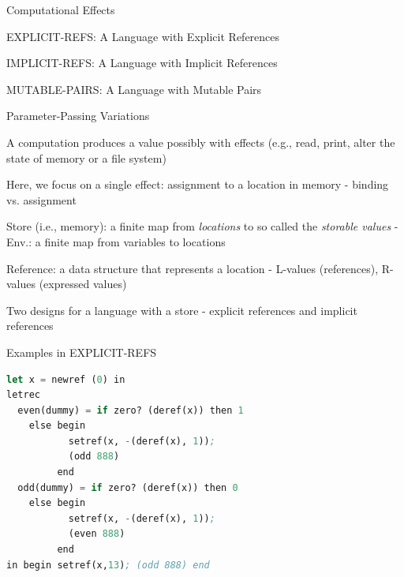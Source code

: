 \documentclass{article}
\begin{document}
\begin{huge}

\sf



\blob Computational Effects

\blob EXPLICIT-REFS: A Language with Explicit References 

\blob IMPLICIT-REFS: A Language with Implicit References 

\blob MUTABLE-PAIRS: A Language with Mutable Pairs

\blob Parameter-Passing Variations


A computation produces a value possibly with effects (e.g., read, print, alter the state of memory or a file system) 

Here, we focus on a single effect: assignment to a location in memory \al
   - binding vs. assignment

Store (i.e., memory): a finite map from {\it locations} to so called the {\it storable values} \al
   - Env.: a finite map from variables to locations

Reference: a data structure that represents a location \al
   - L-values (references), R-values (expressed values)

Two designs for a language with a store \al
   - explicit references and implicit references


\blob Examples in EXPLICIT-REFS

\begin{lstlisting}[language=Lisp]
let x = newref (0) in  
letrec 
  even(dummy) = if zero? (deref(x)) then 1
    else begin
           setref(x, -(deref(x), 1));
           (odd 888)
         end
  odd(dummy) = if zero? (deref(x)) then 0
    else begin 
           setref(x, -(deref(x), 1));
           (even 888)
         end
in begin setref(x,13); (odd 888) end
\end{lstlisting}


\end{huge}
\end{document}
